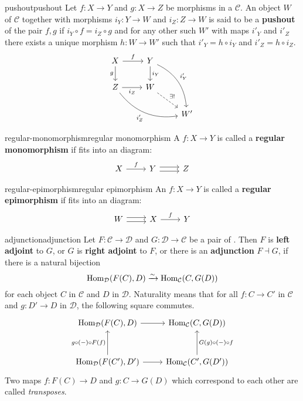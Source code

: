 \begin{topic}{pushout}{pushout}
    Let $f : X \to Y$ and $g : X \to Z$ be morphisms in a  $\mathcal{C}$. An object $W$ of $\mathcal{C}$ together with morphisms $i_Y: Y \to W$ and $i_Z : Z \to W$ is said to be a \textbf{pushout} of the pair $f, g$ if $i_Y \circ f = i_Z \circ g$ and for any other such $W'$ with maps $i'_Y$ and $i'_Z$ there exists a unique morphism $h : W \to W'$ such that $i'_Y = h \circ i_Y$ and $i'_Z = h \circ i_Z$.
    \[ \begin{tikzcd} X \arrow{r}{f} \arrow[swap]{d}{g} & Y \arrow{d}{i_Y} \arrow[bend left=30]{rdd}{i'_Y} & \\ Z \arrow[swap]{r}{i_Z} \arrow[swap, bend right=30]{drr}{i'_Z} & W \arrow[dashed]{rd}{\exists!} & \\ & & W' \end{tikzcd} \]
\end{topic}

\begin{topic}{regular-monomorphism}{regular monomorphism}
    A  $f : X \to Y$ is called a \textbf{regular monomorphism} if fits into an  diagram:
    \[ \begin{tikzcd} X \arrow{r}{f} & Y \arrow[shift left=0.25em]{r} \arrow[shift right=0.25em]{r} & Z \end{tikzcd} \]
\end{topic}

\begin{topic}{regular-epimorphism}{regular epimorphism}
    An  $f : X \to Y$ is called a \textbf{regular epimorphism} if fits into an  diagram:
    \[ \begin{tikzcd} W \arrow[shift left=0.25em]{r} \arrow[shift right=0.25em]{r} & X \arrow{r}{f} & Y \end{tikzcd} \]
\end{topic}

\begin{topic}{adjunction}{adjunction}
    Let $F : \mathcal{C} \to \mathcal{D}$ and $G : \mathcal{D} \to \mathcal{C}$ be a pair of . Then $F$ is \textbf{left adjoint} to $G$, or $G$ is \textbf{right adjoint} to $F$, or there is an \textbf{adjunction} $F \dashv G$, if there is a natural bijection
    \[ \operatorname{Hom}_{\mathcal{D}}(F(C), D) \xrightarrow{\sim} \operatorname{Hom}_{\mathcal{C}}(C, G(D)) \]
    for each object $C$ in $\mathcal{C}$ and $D$ in $\mathcal{D}$. Naturality means that for all $f : C \to C'$ in $\mathcal{C}$ and $g : D' \to D$ in $\mathcal{D}$, the following square commutes.
    \[ \begin{tikzcd}[row sep=3em] \Hom_{\mathcal{D}}(F(C), D) \arrow{r} & \Hom_{\mathcal{C}}(C, G(D)) \\ \Hom_{\mathcal{D}}(F(C'), D') \arrow{r} \arrow{u}{g \circ (-) \circ F(f)} & \Hom_{\mathcal{C}}(C', G(D')) \arrow[swap]{u}{G(g) \circ (-) \circ f} \end{tikzcd} \]
    Two maps $f : F(C) \to D$ and $g : C \to G(D)$ which correspond to each other are called \textit{transposes}.
\end{topic}

